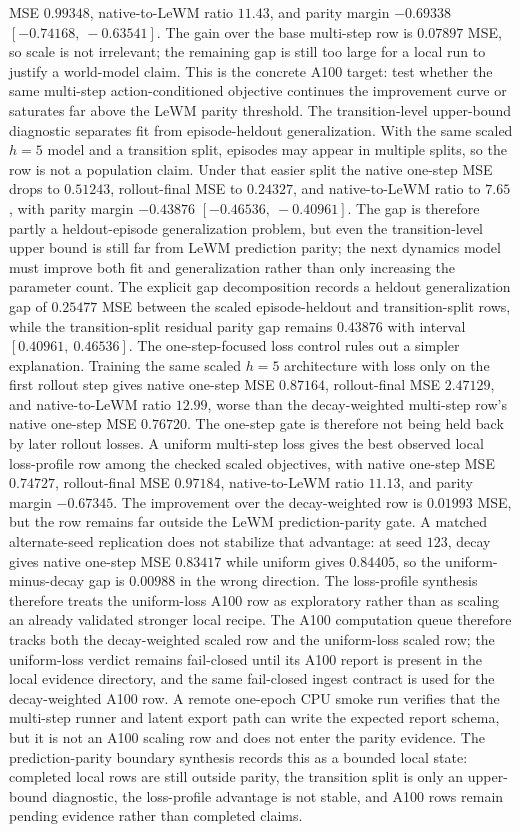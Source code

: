 MSE $0.99348$, native-to-LeWM ratio $11.43$, and parity margin $-0.69338$
$[-0.74168,\ -0.63541]$.  The gain over the base multi-step row is $0.07897$
MSE, so scale is not irrelevant; the remaining gap is still too large for a
local run to justify a world-model claim.  This is the concrete A100 target:
test whether the same multi-step action-conditioned objective continues the
improvement curve or saturates far above the LeWM parity threshold.
The transition-level upper-bound diagnostic separates fit from
episode-heldout generalization.  With the same scaled $h=5$ model and a
transition split, episodes may appear in multiple splits, so the row is not a
population claim.  Under that easier split the native one-step MSE drops to
$0.51243$, rollout-final MSE to $0.24327$, and native-to-LeWM ratio to $7.65$,
with parity margin $-0.43876$ $[-0.46536,\ -0.40961]$.  The gap is therefore
partly a heldout-episode generalization problem, but even the transition-level
upper bound is still far from LeWM prediction parity; the next dynamics model
must improve both fit and generalization rather than only increasing the
parameter count.  The explicit gap decomposition records a heldout
generalization gap of $0.25477$ MSE between the scaled episode-heldout and
transition-split rows, while the transition-split residual parity gap remains
$0.43876$ with interval $[0.40961,\ 0.46536]$.
The one-step-focused loss control rules out a simpler explanation.  Training
the same scaled $h=5$ architecture with loss only on the first rollout step
gives native one-step MSE $0.87164$, rollout-final MSE $2.47129$, and
native-to-LeWM ratio $12.99$, worse than the decay-weighted multi-step row's
native one-step MSE $0.76720$.  The one-step gate is therefore not being held
back by later rollout losses.  A uniform multi-step loss gives the best
observed local loss-profile row among the checked scaled objectives, with
native one-step MSE $0.74727$, rollout-final MSE $0.97184$,
native-to-LeWM ratio $11.13$, and parity margin $-0.67345$.  The improvement
over the decay-weighted row is $0.01993$ MSE, but the row remains far outside
the LeWM prediction-parity gate.  A matched alternate-seed replication does
not stabilize that advantage: at seed $123$, decay gives native one-step MSE
$0.83417$ while uniform gives $0.84405$, so the uniform-minus-decay gap is
$0.00988$ in the wrong direction.  The loss-profile synthesis therefore treats
the uniform-loss A100 row as exploratory rather than as scaling an already
validated stronger local recipe.
The A100 computation queue therefore tracks both the decay-weighted scaled row
and the uniform-loss scaled row; the uniform-loss verdict remains fail-closed
until its A100 report is present in the local evidence directory, and the same
fail-closed ingest contract is used for the decay-weighted A100 row.  A remote
one-epoch CPU smoke run verifies that the multi-step runner and latent export
path can write the expected report schema, but it is not an A100 scaling row
and does not enter the parity evidence.
The prediction-parity boundary synthesis records this as a bounded local
state: completed local rows are still outside parity, the transition split is
only an upper-bound diagnostic, the loss-profile advantage is not stable, and
A100 rows remain pending evidence rather than completed claims.

